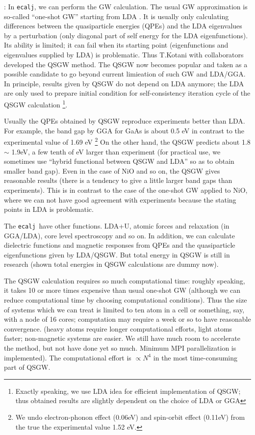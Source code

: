 \documentclass[a4paper,10pt,epsf,fleqn]{article}
\def\ecalj{\texttt{ecalj}}
\begin{document}
: In \ecalj, we can perform the GW calculation.
The usual GW approximation is so-called ``one-shot GW'' starting from
LDA \cite{Kotani2002,friedrich_efficient_2010}.
It is usually only calculating differences between the quasiparticle energies (QPEs) 
and the LDA eigenvalues by a perturbation (only diagonal part of self
energy for the LDA eigenfunctions).
Its ability is limited; it can fail when its starting point 
(eigenfunctions and eigenvalues supplied by LDA) is problematic.
Thus T.Kotani with collaborators developed the QSGW method. 
The QSGW now becomes popular and taken as a possible candidate to go
beyond current limieation of such GW and LDA/GGA.
In principle, results given by QSGW do not depend on LDA anymore; 
the LDA are only used to prepare initial condition for
self-consistency iteration cycle of the QSGW calculation 
\footnote{Exactly speaking, we use LDA idea 
for efficient implementation of QSGW; thus
obtained results are slightly dependent on the choice of LDA or GGA}.

Usually the QPEs obtained by QSGW reproduce experiments better than LDA.
For example, the band gap by GGA for GaAs is about 0.5 eV in contrast
to the experimental value of 1.69 eV 
\footnote{We undo electron-phonon effect
(0.06eV) and spin-orbit effect (0.11eV) from the true the experimental value 1.52 eV.} 
On the other hand, the QSGW predicts about 1.8$\sim$ 1.9eV, a few tenth of eV
larger than experiment (for practical use, we sometimes 
use ``hybrid functional between QSGW and LDA'' 
so as to obtain smaller band gap).
Even in the case of NiO and so on, the QSGW gives reasonable
results (there is a tendency to give a little larger band gaps than experiments).
This is in contrast to the case of the one-shot GW applied to NiO, 
where we can not have good agreement with experiments
because the stating points in LDA is problematic.

The \ecalj\ have other functions.
LDA+U, atomic forces and relaxation (in GGA/LDA), core level
spectroscopy and so on.  In addition, we can calculate
dielectric functions and magnetic responses 
from QPEs and the quasiparticle eigenfunctions 
given by LDA/QSGW.  
But total energy in QSGW is still in research 
(shown total energies in QSGW calculations are dummy now).


The QSGW calculation requires so much computational time:
roughly speaking, it takes 10 or more times expensive than usual
one-shot GW (although we can reduce computational time by choosing
computational conditions).
Thus the size of systems which we can treat is limited to ten atom in a
cell or something, say, with a node of 16 cores;
computation may require a week or so to have reasonable convergence.
(heavy atoms require longer computational efforts,
light atoms faster; non-magnetic systems are easier.
We still have much room to accelerate the method, but not have done
yet so much. Minimum MPI parallelization is implemented).
The computational effort is $\propto N^4$ 
in the most time-consuming part of QSGW.
\end{document}
